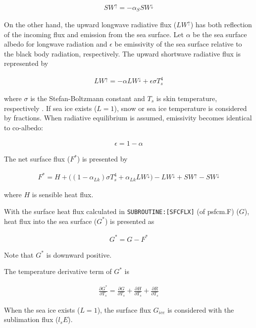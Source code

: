 \begin{eqnarray}
    SW^\uparrow = - \alpha_S SW^\downarrow
\end{eqnarray}

On the other hand, the upward longwave radiative flux (\(LW^\uparrow\))
has both reflection of the incoming flux and emission from the sea
surface. Let \(\alpha\) be the sea surface albedo for longwave radiation
and \(\epsilon\) be emissivity of the sea surface relative to the black
body radiation, respectively. The upward shortwave radiative flux is
represented by

\begin{eqnarray}
    LW^\uparrow = - \alpha LW^\downarrow + \epsilon \sigma T_s ^4
\end{eqnarray}

where \(\sigma\) is the Stefan-Boltzmann constant and \(T_s\) is skin
temperature, respectively . If sea ice exists (\(L=1\)), snow or sea ice
temperature is considered by fractions. When radiative equilibrium is
assumed, emissivity becomes identical to co-albedo:

\begin{eqnarray}
    \epsilon = 1 - \alpha
\end{eqnarray}

The net surface flux (\(F^*\)) is presented by

\begin{eqnarray}
    F^*=H + \Big((1-\alpha_{Lk})\sigma T_s^4 + \alpha_{Lk} LW^\downarrow\Big)  - LW^\downarrow +SW^\uparrow - SW^\downarrow
\end{eqnarray}

where \(H\) is sensible heat flux.

With the surface heat flux calculated in
\texttt{SUBROUTINE:{[}SFCFLX{]}} (of psfcm.F) (\(G\)), heat flux into
the sea surface (\(G^*\)) is presented as

\begin{eqnarray}
    G^* = G - F^*
\end{eqnarray}

Note that \(G^*\) is downward positive.

The temperature derivative term of \(G^*\) is

\begin{eqnarray}
    \frac{\partial G^*}{\partial T_s} = \frac{\partial G}{\partial T_s}+\frac{\partial H}{\partial T_s}+\frac{\partial R}{\partial T_s}
\end{eqnarray}

When the sea ice exists (\(L=1\)), the surface flux \(G_{ice}\) is
considered with the sublimation flux (\(l_s E\)).

